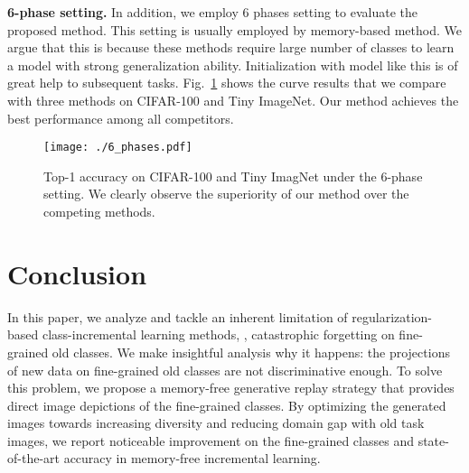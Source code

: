 \documentclass[10pt,twocolumn,letterpaper]{article}
\begin{document}
\textbf{6-phase setting.}
In addition, we employ 6 phases setting to evaluate the proposed method.
This setting is usually employed by memory-based method. We argue that this is because these methods require large number of classes to learn a model with strong generalization ability. Initialization with model like this is of great help to subsequent tasks. 
Fig.~\ref{6phases} shows the curve results that we compare with three methods on CIFAR-100 and Tiny ImageNet. Our method achieves the best performance among all competitors. 



\begin{figure}[!t]
\begin{center}
 \texttt{[image: ./6\_phases.pdf]}
 \end{center}
 \vspace{-5mm}
\caption{\small{Top-1 accuracy on CIFAR-100 and Tiny ImagNet under the 6-phase setting. We clearly observe the superiority of our method over the competing methods.}}
\label{6phases}
\vspace{-3mm}
\end{figure}

\vspace{-2mm}
\section{Conclusion}
In this paper, we analyze and tackle an inherent limitation of regularization-based class-incremental learning methods, \ie, catastrophic forgetting on fine-grained old classes. We make insightful analysis why it happens: the projections of new data on fine-grained old classes are not discriminative enough.
To solve this problem, we propose a memory-free generative replay strategy that provides direct image depictions of the fine-grained classes. By optimizing the generated images towards increasing diversity and reducing domain gap with old task images, we report noticeable improvement on the fine-grained classes and state-of-the-art accuracy in memory-free incremental learning.

{\small


}
\end{document}
